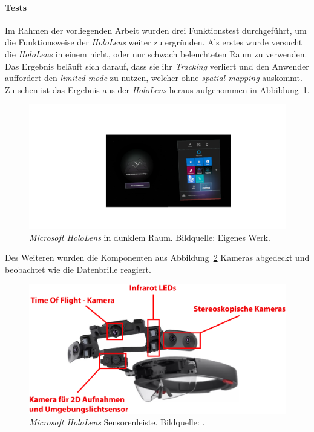 \paragraph*{Tests} Im Rahmen der vorliegenden Arbeit wurden drei Funktionstest durchgeführt, um die Funktionsweise der \textit{HoloLens} weiter zu ergründen. Als erstes wurde versucht die \textit{HoloLens} in einem nicht, oder nur schwach beleuchteten Raum zu verwenden. Das Ergebnis beläuft sich darauf, dass sie ihr \textit{Tracking} verliert und den Anwender auffordert den \textit{limited mode} zu nutzen, welcher ohne \textit{spatial mapping} auskommt. Zu sehen ist das Ergebnis aus der \textit{HoloLens} heraus aufgenommen in Abbildung~\ref{fig:holoLens_dunkel}.
\begin{figure}[H]
	\centering
	\includegraphics[width=1.0\textwidth]{figuren/holoLens_unbeleuchtet}
	\caption{\textit{Microsoft HoloLens} in dunklem Raum. Bildquelle: Eigenes Werk.}
	\label{fig:holoLens_dunkel}
\end{figure}
Des Weiteren wurden die Komponenten aus Abbildung~\ref{fig:holoLens_Sensor_Bar} Kameras abgedeckt und beobachtet wie die Datenbrille reagiert.
\begin{figure}[H]
	\centering
	\includegraphics[width=1.\textwidth]{figuren/holoLens_Sensor_Bar}
	\caption{\textit{Microsoft HoloLens} Sensorenleiste. Bildquelle: \cite{holoLensSensor}.}
	\label{fig:holoLens_Sensor_Bar}
\end{figure}
